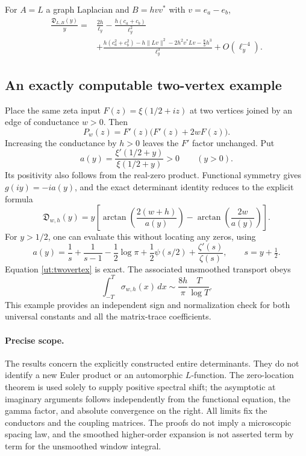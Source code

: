 \begin{corollary}
For $A=L$ a graph Laplacian and $B=hvv^*$ with $v=e_a-e_b$,
\begin{align*}
 \frac{\mathfrak D_{L,B}(y)}y
 ={}&\frac{2h}{\ell_y}-\frac{h(c_a+c_b)}{\ell_y^2}\\
 &+\frac{h(c_a^2+c_b^2)-h\|Lv\|^2
            -2h^2v^*Lv-\frac83h^3}{\ell_y^3}
       +O(\ell_y^{-4}).
\end{align*}
\end{corollary}

\subsection{An exactly computable two-vertex example}

Place the same zeta input $F(z)=\xi(1/2+iz)$ at two vertices joined by
an edge of conductance $w>0$. Then
\[
 P_w(z)=F'(z)\bigl(F'(z)+2wF(z)\bigr).
\]
Increasing the conductance by $h>0$ leaves the $F'$ factor unchanged.
Put
\[
 a(y)=\frac{\xi'(1/2+y)}{\xi(1/2+y)}>0\qquad(y>0).
\]
Its positivity also follows from the real-zero product. Functional
symmetry gives $g(iy)=-ia(y)$, and the exact determinant identity reduces
to the explicit formula
\begin{equation}\label{ut:twovertex}
 \boxed{\quad
 \mathfrak D_{w,h}(y)
  =y\left[\arctan\!\left(\frac{2(w+h)}{a(y)}\right)
             -\arctan\!\left(\frac{2w}{a(y)}\right)\right].
 \quad}
\end{equation}
For $y>1/2$, one can evaluate this without locating any zeros, using
\[
 a(y)=\frac1s+\frac1{s-1}-\frac12\log\pi
           +\frac12\psi(s/2)+\frac{\zeta'(s)}{\zeta(s)},
          \qquad s=y+\tfrac12.
\]
Equation \eqref{ut:twovertex} is exact. The associated unsmoothed
transport obeys
\[
 \int_{-T}^{T}\sigma_{w,h}(x)\,dx
                  \sim\frac{8h}{\pi}\frac{T}{\log T}.
\]
This example provides an independent sign and normalization check for
both universal constants and all the matrix-trace coefficients.

\paragraph{Precise scope.}
The results concern the explicitly constructed entire determinants.
They do not identify a new Euler product or an automorphic $L$-function.
The zero-location theorem is used solely to supply positive spectral
shift; the asymptotic at imaginary arguments follows independently from
the functional equation, the gamma factor, and absolute convergence on
the right. All limits fix the conductors and the coupling matrices.
The proofs do not imply a microscopic spacing law, and the smoothed
higher-order expansion is not asserted term by term for the unsmoothed
window integral.
